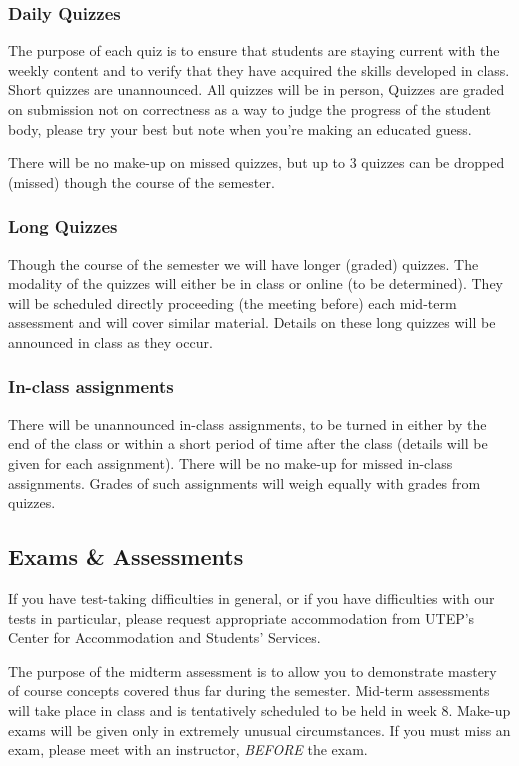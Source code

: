 \documentclass[12pt]{scrartcl}
\begin{document}
\subsubsection{Daily Quizzes}
The purpose of each quiz is to ensure that students are staying current with the weekly content and to verify that they have acquired the skills developed in class. 
Short quizzes are unannounced. 
All quizzes will be in person, 
Quizzes are graded on submission not on correctness as a way to judge the progress of the student body, please try your best but note when you're making an educated guess. 

There will be no make-up on missed quizzes, but up to 3 quizzes can be dropped (missed) though the course of the semester.
 
 \subsubsection{Long Quizzes}
 Though the course of the semester we will have longer (graded) quizzes. 
 The modality of the quizzes will either be in class or online (to be determined). 
 They will be scheduled directly proceeding (the meeting before) each mid-term assessment and will cover similar material. 
 Details on these long quizzes will be announced in class as they occur. 
 
\subsubsection{In-class assignments}
There will be unannounced in-class assignments, to be turned in either by the end of the class or within a short period of time after the class (details will be given for each assignment). 
There will be no make-up for missed in-class assignments. 
Grades of such assignments will weigh equally with grades from quizzes. 


\subsection{Exams \& Assessments}
If you have test-taking difficulties in general, or if you have difficulties with our tests in particular, please request appropriate accommodation from UTEP’s Center for Accommodation and Students’ Services.

The purpose of the midterm assessment is to allow you to demonstrate mastery of course concepts covered thus far during the semester. 
Mid-term assessments will take place 
in class 
and is tentatively scheduled to be held in week 8. 
Make-up exams will be given only in extremely unusual circumstances. 
If you must miss an exam, please meet with an instructor, \textit{BEFORE} the exam. 
\end{document}
